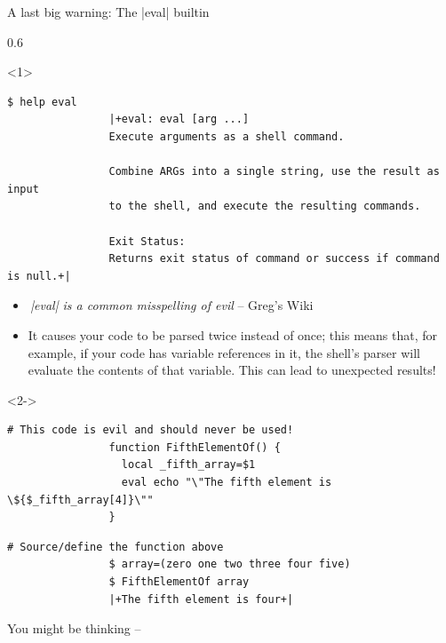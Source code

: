 \begin{frame}[fragile]{A last big warning: The \bash|eval| builtin}
    \vspace{1mm}
    \begin{overlayarea}{\textwidth}{0.6\textheight}
        \begin{onlyenv}<1>
            \begin{lstlisting}[style=MyBash, numbers=none, xleftmargin=2mm, xrightmargin=2mm]
                $ help eval
                |+eval: eval [arg ...]
                Execute arguments as a shell command.

                Combine ARGs into a single string, use the result as input
                to the shell, and execute the resulting commands.

                Exit Status:
                Returns exit status of command or success if command is null.+|
            \end{lstlisting}
            \begin{itemize}
                \item \emph{\guillemotleft\textnormal{\,\bash|eval|} is a common misspelling of \alert{evil}\guillemotright} -- Greg's Wiki
                \item It causes your code to be parsed twice instead of once; this means that, for example, if your code has variable references in it, the shell's parser will evaluate the contents of that variable.
                      This can lead to unexpected results!
            \end{itemize}
        \end{onlyenv}
        \begin{onlyenv}<2->
            \begin{lstlisting}[style=MyBash, emph={[7]_fifth_array}]
                # This code is evil and should never be used!
                function FifthElementOf() {
                  local _fifth_array=$1
                  eval echo "\"The fifth element is \${$_fifth_array[4]}\""
                }
            \end{lstlisting}
            \smallskip
            \begin{lstlisting}[style=MyBash, emph={[7]_fifth_array}, belowskip=-5mm, firstnumber=6]
                # Source/define the function above
                $ array=(zero one two three four five)
                $ FifthElementOf array
                |+The fifth element is four+|
            \end{lstlisting}
            You might be thinking --  

\end{onlyenv}
\end{overlayarea}
\end{frame}
